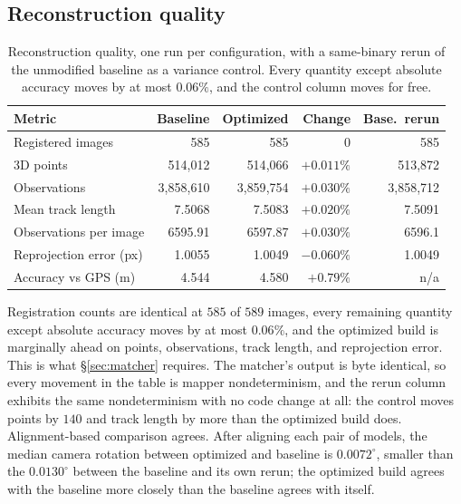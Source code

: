 \documentclass[conference]{IEEEtran}
\begin{document}
\subsection{Reconstruction quality}
\label{sec:quality}

\begin{table}[t]
\centering
\scriptsize
\setlength{\tabcolsep}{4pt}
\caption{Reconstruction quality, one run per configuration, with a same-binary
rerun of the unmodified baseline as a variance control. Every quantity except
absolute accuracy moves by at most $0.06\%$, and the control column moves for
free.}
\label{tab:quality}
\setlength{\tabcolsep}{3pt}
\begin{tabular}{@{}lrrrr@{}}
\toprule
Metric & Baseline & Optimized & Change & Base.\ rerun \\
\midrule
Registered images        & 585       & 585       & $0$ & 585 \\
3D points                & 514{,}012 & 514{,}066 & $+0.011\%$ & 513{,}872 \\
Observations             & 3{,}858{,}610 & 3{,}859{,}754 & $+0.030\%$ & 3{,}858{,}712 \\
Mean track length        & 7.5068    & 7.5083    & $+0.020\%$ & 7.5091 \\
Observations per image   & 6595.91   & 6597.87   & $+0.030\%$ & 6596.1 \\
Reprojection error (px)  & 1.0055    & 1.0049    & $-0.060\%$ & 1.0049 \\
Accuracy vs GPS (m)      & 4.544     & 4.580     & $+0.79\%$ & n/a \\
\bottomrule
\end{tabular}
\end{table}

Registration counts are identical at $585$ of $589$ images, every remaining
quantity
except absolute accuracy moves by at most $0.06\%$, and the optimized build is
marginally ahead on points, observations, track length, and reprojection error.
This is what \S\ref{sec:matcher} requires. The matcher's output is byte
identical, so every movement in the table is mapper nondeterminism, and the
rerun column exhibits the same nondeterminism with no code change at all: the
control moves points by $140$ and track length by more than the optimized build
does. Alignment-based comparison agrees. After aligning each pair of models,
the median camera rotation between optimized and baseline is $0.0072^{\circ}$,
smaller than the $0.0130^{\circ}$ between the baseline and its own rerun; the
optimized build agrees with the baseline more closely than the baseline agrees
with itself.
\end{document}
